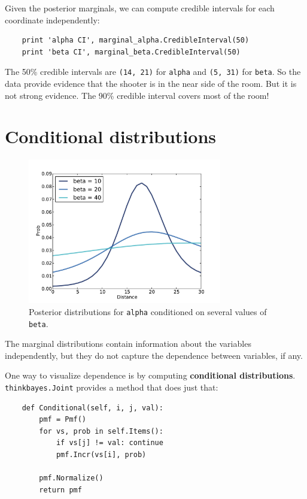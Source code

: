 \documentclass[12pt]{book}
\begin{document}
Given the posterior marginals, we can compute credible intervals
for each coordinate independently:

\begin{verbatim}
    print 'alpha CI', marginal_alpha.CredibleInterval(50)
    print 'beta CI', marginal_beta.CredibleInterval(50)
\end{verbatim}

The 50\% credible intervals are {\tt (14, 21)} for {\tt alpha} and
{\tt (5, 31)} for {\tt beta}.  So the data provide evidence that the
shooter is in the near side of the room.  But it is not strong
evidence.  The 90\% credible interval covers most of the room!


\section{Conditional distributions}

\begin{figure}
\centerline{\includegraphics[height=2.5in]{figs/paintball3.pdf}}
\caption{Posterior distributions for {\tt alpha} conditioned on several values
of {\tt beta}.}
\label{fig.paintball3}
\end{figure}

The marginal distributions contain information about the variables
independently, but they do not capture the dependence between
variables, if any.

One way to visualize dependence is by computing {\bf conditional
distributions}.  {\tt thinkbayes.Joint} provides a method that
does just that:

\begin{verbatim}
    def Conditional(self, i, j, val):
        pmf = Pmf()
        for vs, prob in self.Items():
            if vs[j] != val: continue
            pmf.Incr(vs[i], prob)

        pmf.Normalize()
        return pmf
\end{verbatim}
\end{document}
